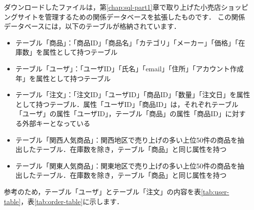 ダウンロードしたファイルは，第\ref{chap:sql-part1}章で取り上げた小売店ショッピングサイトを管理するための関係データベースを拡張したものです．
この関係データベースには，以下のテーブルが格納されています．
\begin{itemize}
    \item テーブル「商品」：「商品ID」「商品名」「カテゴリ」「メーカー」「価格」「在庫数」を属性として持つテーブル
    \item テーブル「ユーザ」：「ユーザID」「氏名」「email」「住所」「アカウント作成年」を属性として持つテーブル
    \item テーブル「注文」：「注文ID」「ユーザID」「商品ID」「数量」「注文日」を属性として持つテーブル．属性「ユーザID」「商品ID」は，それぞれテーブル「ユーザ」の属性「ユーザID」，テーブル「商品」の属性「商品ID」に対する外部キーとなっている
    \item テーブル「関西人気商品」：関西地区で売り上げの多い上位50件の商品を抽出したテーブル．在庫数を除き，テーブル「商品」と同じ属性を持つ
    \item テーブル「関東人気商品」：関東地区で売り上げの多い上位50件の商品を抽出したテーブル．在庫数を除き，テーブル「商品」と同じ属性を持つ
\end{itemize}
参考のため，テーブル「ユーザ」とテーブル「注文」の内容を表\ref{tab:user-table}，表\ref{tab:order-table}に示します．
\begin{table}[!htbp]
    \centering
    \caption{テーブル「ユーザ」の内容．}
    \label{tab:user-table}
\end{table}

